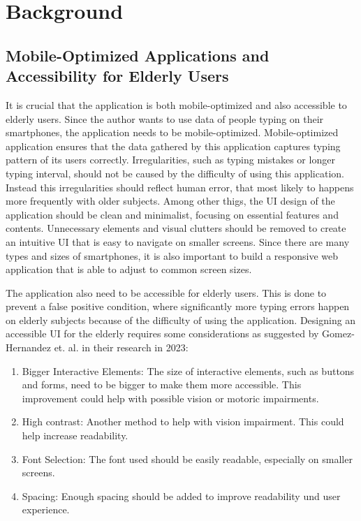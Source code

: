 \chapter{Background}


\section{Mobile-Optimized Applications and Accessibility for Elderly Users}

It is crucial that the application is both mobile-optimized and also accessible to elderly users.
Since the author wants to use data of people typing on their smartphones, the application needs to be mobile-optimized.
Mobile-optimized application ensures that the data gathered by this application captures typing pattern of its users correctly.
Irregularities, such as typing mistakes or longer typing interval, should not be caused by the difficulty of using this application.
Instead this irregularities should reflect human error, that most likely to happens more frequently with older subjects.
Among other thigs, the \ac{UI} design of the application should be clean and minimalist, focusing on essential features and contents.
Unnecessary elements and visual clutters should be removed to create an intuitive \ac{UI} that is easy to navigate on smaller screens.
Since there are many types and sizes of smartphones, it is also important to build a responsive web application that is able to adjust to common screen sizes.

The application also need to be accessible for elderly users.
This is done to prevent a false positive condition, where significantly more typing errors happen on elderly subjects because of the difficulty of using the application.
Designing an accessible \ac{UI} for the elderly requires some considerations as suggested by Gomez-Hernandez et. al. in their research in 2023\cite{hernandez2023}:
\begin{enumerate}
    \item Bigger Interactive Elements: The size of interactive elements, such as buttons and forms, need to be bigger to make them more accessible.
    This improvement could help with possible vision or motoric impairments.
    \item High contrast: Another method to help with vision impairment.
    This could help increase readability.
    \item Font Selection: The font used should be easily readable, especially on smaller screens.
    \item Spacing: Enough spacing should be added to improve readability und user experience.
\end{enumerate}


